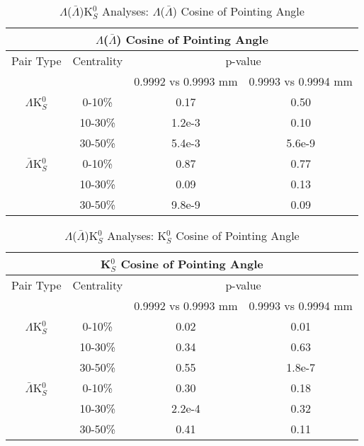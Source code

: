 \documentclass[../AnalysisNoteJBuxton.tex]{subfiles}
\begin{document}
\begin{table}
 \centering
 \begin{tabular}{|c|c|c|c|}
 \multicolumn{4}{c}{$\Lambda$($\bar{\Lambda}$) Cosine of Pointing Angle} \\
  \hline
  Pair Type & Centrality & \multicolumn{2}{c|}{p-value} \\
  \cline{3-4}
   & & 0.9992 vs 0.9993 mm & 0.9993 vs 0.9994 mm \\
  \hline
  $\Lambda$K$^{0}_{S}$ & 0-10\% & 0.17 & 0.50 \\
   & 10-30\% & 1.2e-3 & 0.10 \\
   & 30-50\% & 5.4e-3 & 5.6e-9 \\
  \hline
  $\bar{\Lambda}$K$^{0}_{S}$ & 0-10\% & 0.87 & 0.77 \\
   & 10-30\% & 0.09 & 0.13 \\
   & 30-50\% & 9.8e-9 & 0.09 \\
  \hline
 \end{tabular}
 \caption{$\Lambda$($\bar{\Lambda}$)K$^{0}_{S}$ Analyses: $\Lambda$($\bar{\Lambda}$) Cosine of Pointing Angle}
 \label{tab:LamCosPointingAngleLamKch}
\end{table}

\begin{table}
 \centering
 \begin{tabular}{|c|c|c|c|}
 \multicolumn{4}{c}{K$^{0}_{S}$ Cosine of Pointing Angle} \\
  \hline
  Pair Type & Centrality & \multicolumn{2}{c|}{p-value} \\
  \cline{3-4}
   & & 0.9992 vs 0.9993 mm & 0.9993 vs 0.9994 mm \\
  \hline
  $\Lambda$K$^{0}_{S}$ & 0-10\% & 0.02 & 0.01 \\
   & 10-30\% & 0.34 & 0.63 \\
   & 30-50\% & 0.55 & 1.8e-7 \\
  \hline
  $\bar{\Lambda}$K$^{0}_{S}$ & 0-10\% & 0.30 & 0.18 \\
   & 10-30\% & 2.2e-4 & 0.32 \\
   & 30-50\% & 0.41 & 0.11 \\
  \hline
 \end{tabular}
 \caption{$\Lambda$($\bar{\Lambda}$)K$^{0}_{S}$ Analyses: K$^{0}_{S}$ Cosine of Pointing Angle}
 \label{tab:K0CosPointingAngleLamKch}
\end{table}
\end{document}
